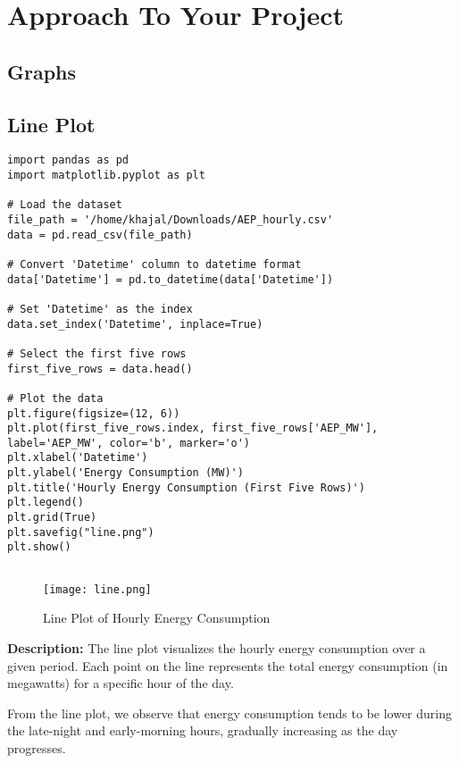 \documentclass{article}
\begin{document}
\section{Approach To Your Project}
\subsection{Graphs}

\subsection{Line Plot}
\begin{lstlisting}[caption={Python code for Line Plot}]
import pandas as pd
import matplotlib.pyplot as plt

# Load the dataset
file_path = '/home/khajal/Downloads/AEP_hourly.csv'
data = pd.read_csv(file_path)

# Convert 'Datetime' column to datetime format
data['Datetime'] = pd.to_datetime(data['Datetime'])

# Set 'Datetime' as the index
data.set_index('Datetime', inplace=True)

# Select the first five rows
first_five_rows = data.head()

# Plot the data
plt.figure(figsize=(12, 6))
plt.plot(first_five_rows.index, first_five_rows['AEP_MW'], label='AEP_MW', color='b', marker='o')
plt.xlabel('Datetime')
plt.ylabel('Energy Consumption (MW)')
plt.title('Hourly Energy Consumption (First Five Rows)')
plt.legend()
plt.grid(True)
plt.savefig("line.png")
plt.show()


\end{lstlisting}

\begin{figure}[H]
    \centering
    \texttt{[image: line.png]}
    \caption{Line Plot of Hourly Energy Consumption}
    \label{fig:Line_plot}
\end{figure}

\textbf{Description:}
The line plot visualizes the hourly energy consumption over a given period. Each point on the line represents the total energy consumption (in megawatts) for a specific hour of the day.

From the line plot, we observe that energy consumption tends to be lower during the late-night and early-morning hours, gradually increasing as the day progresses.


\end{document}
